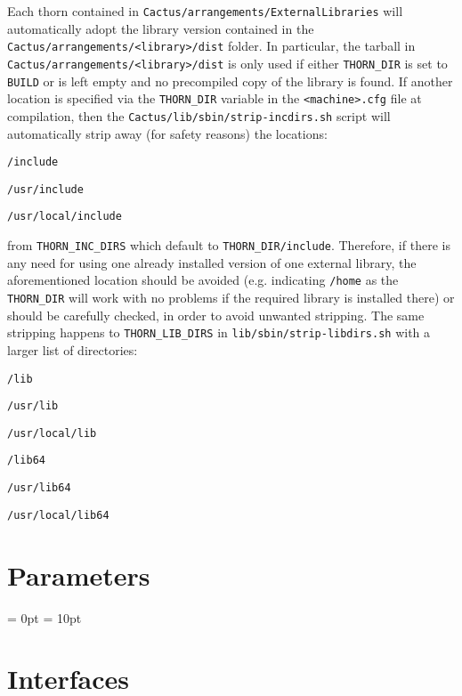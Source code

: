 Each thorn contained in \texttt{Cactus/arrangements/ExternalLibraries} will automatically adopt the library version contained in the \texttt{Cactus/arrangements/<library>/dist} folder. In particular, the tarball in \texttt{Cactus/arrangements/<library>/dist} is only used if either \texttt{THORN\_DIR} is set to \texttt{BUILD} or is left empty and no precompiled copy of the library is found. If another location is specified via the \texttt{THORN\_DIR} variable in the \texttt{<machine>.cfg} file at compilation, then the \texttt{Cactus/lib/sbin/strip-incdirs.sh} script will automatically strip away (for safety reasons) the locations:
\begin{Lentry}
\item [\texttt{/include}]
\item [\texttt{/usr/include}]
\item [\texttt{/usr/local/include}]
\end{Lentry}
from \texttt{THORN\_INC\_DIRS} which default to \texttt{THORN\_DIR/include}. Therefore, if there is any need for using one already installed version of one external library, the aforementioned location should be avoided (e.g. indicating \texttt{/home} as the \texttt{THORN\_DIR} will work with no problems if the required library is installed there) or should be carefully checked, in order to avoid unwanted stripping. The same stripping happens to \texttt{THORN\_LIB\_DIRS} in \texttt{lib/sbin/strip-libdirs.sh} with a larger list of directories:
\begin{Lentry}
\item [\texttt{/lib}]
\item [\texttt{/usr/lib}]
\item [\texttt{/usr/local/lib}]
\item [\texttt{/lib64}]
\item [\texttt{/usr/lib64}]
\item [\texttt{/usr/local/lib64}] 
\end{Lentry}




\section{Parameters} 


\parskip = 0pt
\parskip = 10pt 

\section{Interfaces} 


